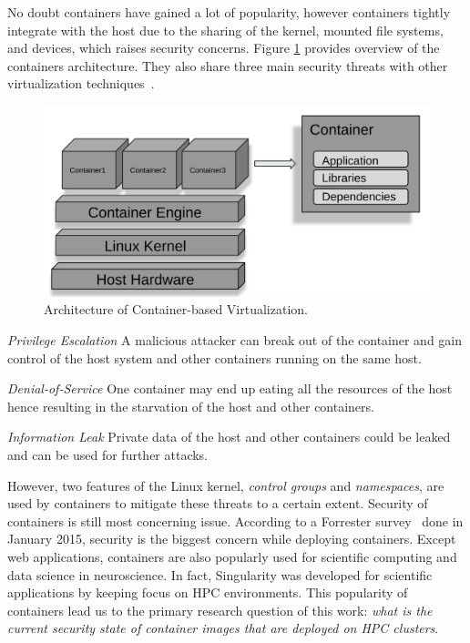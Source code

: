 \documentclass[a4paper,num-refs]{oup-contemporary}
\begin{document}
No doubt containers have gained a lot of popularity, however containers tightly
integrate with the host due to the sharing of the kernel, 
mounted file systems, and devices, which raises security
concerns. Figure \ref{fig:container-overview} provides overview of the containers architecture.
They also share three main security threats with other virtualization
techniques~\cite{gantikow2016providing}.

\begin{figure}
  \centering
  \includegraphics[width=.7\columnwidth]{Figures/container.png}
  \caption{Architecture of Container-based
                Virtualization.}
  \label{fig:container-overview}
\end{figure}

\textit{Privilege Escalation} A malicious attacker can break out of the container
and gain control of the host system and other containers running on the same host.

\textit{Denial-of-Service} One container may end up eating all the resources of the
host hence resulting in the starvation of the host and other containers.

\textit{Information Leak} Private data of the host and other containers could be
leaked and can be used for further attacks.


However, two features of the Linux kernel, \textit{control groups} and \textit{namespaces},
are used by containers to mitigate these threats to a certain extent. Security
of containers is still most concerning issue. According to a Forrester survey~\cite{} done in January
2015, security is the
biggest concern while deploying containers.
Except web applications, containers are also popularly used for scientific computing
and data science in neuroscience. In fact, Singularity was developed for scientific applications
by keeping focus on HPC environments. This popularity of containers lead us to the
primary research question of this work: \textit{what is the current security state of
container images that are deployed on HPC clusters}.
\end{document}
